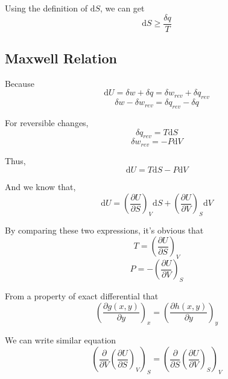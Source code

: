 \documentclass[letterpaper]{article}
\newcommand{\diff}{\mathrm{d}}
\begin{document}
Using the definition of $\diff S$, we can get
\begin{equation*}
    \boxed{\diff S\geq\frac{\delta q}{T}}
\end{equation*}

\subsection*{Maxwell Relation}
Because
\begin{equation*}
    \diff U=\delta w+\delta q=\delta w_{rev}+\delta q_{rev}
\end{equation*}
\begin{equation*}
    \delta w-\delta w_{rev}=\delta q_{rev} - \delta q
\end{equation*}

For reversible changes,
\begin{equation*}
    \delta q_{rev} = T\diff S
\end{equation*}
\begin{equation*}
    \delta w_{rev} = -P\diff V
\end{equation*}

Thus,
\begin{equation*}
    \diff U=T\diff S-P\diff V
\end{equation*}

And we know that,
\begin{equation*}
    \diff U=(\frac{\partial U}{\partial S})_V\diff S+(\frac{\partial U}{\partial V})_S\diff V
\end{equation*}

By comparing these two expressions, it's obvious that
\begin{equation*}
    T=(\frac{\partial U}{\partial S})_V
\end{equation*}
\begin{equation*}
    P=-(\frac{\partial U}{\partial V})_S
\end{equation*}

From a property of exact differential that
\begin{equation*}
    (\frac{\partial g(x, y)}{\partial y})_x=(\frac{\partial h(x, y)}{\partial y})_y
\end{equation*}

We can write similar equation
\begin{equation*}
    (\frac{\partial}{\partial V}(\frac{\partial U}{\partial S})_V)_S=
    (\frac{\partial}{\partial S}(\frac{\partial U}{\partial V})_S)_V
\end{equation*}
\end{document}
